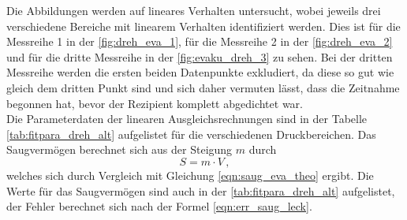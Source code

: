     \noindent Die Abbildungen werden auf lineares Verhalten untersucht, wobei jeweils drei verschiedene Bereiche mit linearem Verhalten identifiziert werden. 
    Dies ist für die Messreihe 1 in der \autoref{fig:dreh_eva_1}, für die Messreihe 2 in der \autoref{fig:dreh_eva_2} und für die dritte Messreihe in der 
    \autoref{fig:evaku_dreh_3} zu sehen. Bei der dritten Messreihe werden die ersten beiden Datenpunkte exkludiert, da diese so gut wie gleich dem dritten Punkt sind und sich 
    daher vermuten lässt, dass die Zeitnahme begonnen hat, bevor der Rezipient komplett abgedichtet war.\\ 
    Die Parameterdaten der linearen Ausgleichsrechnungen sind in der Tabelle \autoref{tab:fitpara_dreh_alt} aufgelistet für die verschiedenen Druckbereichen. Das Saugvermögen berechnet sich 
    aus der Steigung $m$ durch 
    \begin{equation*}
      S = m \cdot V\, ,
    \end{equation*}
    welches sich durch Vergleich mit Gleichung \eqref{eqn:saug_eva_theo} ergibt.
    Die Werte für das Saugvermögen sind auch in der \autoref{tab:fitpara_dreh_alt} aufgelistet, der Fehler berechnet sich nach der Formel \eqref{eqn:err_saug_leck}. 

